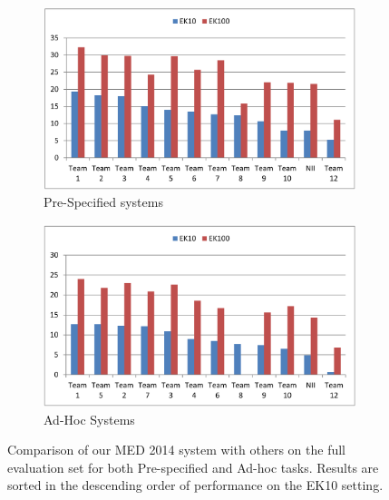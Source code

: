 \begin{figure}
	\centering
	\begin{subfigure}{\textwidth}
		\centering
		\includegraphics[width=0.7\linewidth]{med_result_ps.pdf}
		\caption{Pre-Specified systems}
		\label{fig_result_ps}
	\end{subfigure} 
	\begin{subfigure}{\textwidth}
		\centering
		\includegraphics[width=0.7\linewidth]{med_result_ah.pdf}
		\caption{Ad-Hoc Systems}
		\label{fig_result_ah}
	\end{subfigure}
	\caption{Comparison of our MED 2014 system with others on the full evaluation set for both Pre-specified and Ad-hoc tasks. Results are sorted in the descending order of performance on the EK10 setting.}
	\label{fig:results}
\end{figure}


